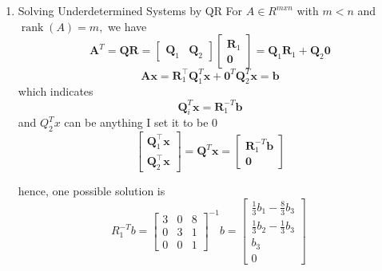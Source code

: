 \documentclass[english,onecolumn]{IEEEtran}
\begin{document}
\begin{enumerate}
\item 
Solving Underdetermined Systems by QR For $A \in R^{m x n}$ with $m<n$ and $\operatorname{rank}(A)=m,$ we have
$$
\mathbf{A}^{T}=\mathbf{Q R}=\left[\begin{array}{ll}
	\mathbf{Q}_{1} & \mathbf{Q}_{2}
\end{array}\right]\left[\begin{array}{c}
	\mathbf{R}_{1} \\
	\mathbf{0}
\end{array}\right]=\mathbf{Q}_{1} \mathbf{R}_{1}+\mathbf{Q}_{2} \mathbf{0}
$$
$$
\mathbf{A} \mathbf{x}=\mathbf{R}_{1}^{\top} \mathbf{Q}_{1}^{T} \mathbf{x}+\mathbf{0}^{T} \mathbf{Q}_{2}^{T} \mathbf{x}=\mathbf{b}
$$
which indicates
$$
\mathbf{Q}_{i}^{T} \mathbf{x}=\mathbf{R}_{1}^{-T} \mathbf{b}
$$
and $Q_{2}^{T} x$ can be anything I set it to be 0 
$$
\left[\begin{array}{l}
	\mathbf{Q}_{1}^{\top} \mathbf{x} \\
	\mathbf{Q}_{2}^{\top} \mathbf{x}
\end{array}\right]=\mathbf{Q}^{T} \mathbf{x}=\left[\begin{array}{c}
	\mathbf{R}_{1}^{-T} \mathbf{b} \\
	\mathbf{0}
\end{array}\right]
$$


hence, one possible solution is
$$
R_{1}^{-T} b = 
\begin{bmatrix}
	3&0&8\\
	0&3&1\\
	0&0&1
\end{bmatrix}^{-1} b=
\begin{bmatrix}
	\frac{1}{3}b_1-\frac{8}{3}b_3\\
	\frac{1}{3}b_2-\frac{1}{3}b_3\\
	b_3\\
	0
\end{bmatrix}\
$$


\end{enumerate}
\end{document}
